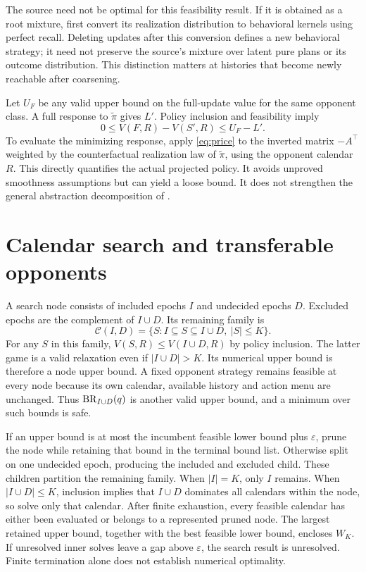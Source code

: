 The source need not be optimal for this feasibility result. If it is obtained
as a root mixture, first convert its realization distribution to behavioral
kernels using perfect recall. Deleting updates after this conversion defines
a new behavioral strategy; it need not preserve the source's mixture over
latent pure plans or its outcome distribution. This distinction matters at
histories that become newly reachable after coarsening.

Let $U_F$ be any valid upper bound on the full-update value for the same
opponent class. A full response to $\widetilde\pi$ gives $L'$. Policy inclusion
and feasibility imply
\[
 0\le V(F,R)-V(S',R)\le U_F-L'.
\]
To evaluate the minimizing response, apply \eqref{eq:price} to the inverted
matrix $-A^\top$ weighted by the counterfactual realization law of
$\widetilde\pi$, using the opponent calendar $R$. This directly quantifies
the actual projected policy. It avoids unproved smoothness assumptions but
can yield a loose bound. It does not strengthen the general abstraction
decomposition of \citet{kroer2018}.

\section{Calendar search and transferable opponents}
A search node consists of included epochs $I$ and undecided epochs $D$.
Excluded epochs are the complement of $I\cup D$. Its remaining family is
\[
 \mathcal C(I,D)=\{S:I\subseteq S\subseteq I\cup D,\ |S|\le K\}.
\]
For any $S$ in this family, $V(S,R)\le V(I\cup D,R)$ by policy inclusion.
The latter game is a valid relaxation even if $|I\cup D|>K$. Its numerical
upper bound is therefore a node upper bound. A fixed opponent strategy
remains feasible at every node because its own calendar, available history
and action menu are unchanged. Thus $\operatorname{BR}_{I\cup D}(q)$ is another valid upper
bound, and a minimum over such bounds is safe.

If an upper bound is at most the incumbent feasible lower bound plus
$\varepsilon$, prune the node while retaining that bound in the terminal
bound list. Otherwise split on one undecided epoch, producing the included
and excluded child. These children partition the remaining family. When
$|I|=K$, only $I$ remains. When $|I\cup D|\le K$, inclusion implies that
$I\cup D$ dominates all calendars within the node, so solve only that calendar.
After finite exhaustion, every feasible calendar has either been evaluated
or belongs to a represented pruned node. The largest retained upper bound,
together with the best feasible lower bound, encloses $W_K$. If unresolved
inner solves leave a gap above $\varepsilon$, the search result is unresolved.
Finite termination alone does not establish numerical optimality.

